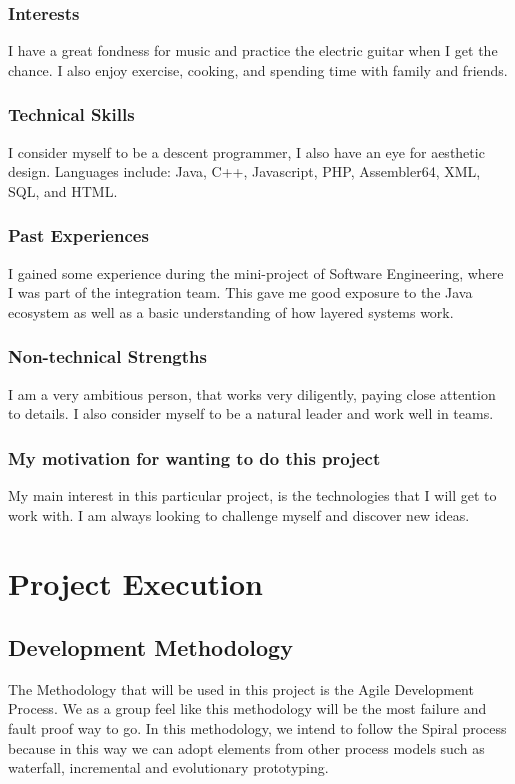 \documentclass[a4paper,12pt]{article}
\begin{document}
			\subsubsection{Interests}
			I have a great fondness for music and practice the electric guitar when I get the chance. I also enjoy exercise, cooking, and spending time with family and friends.
			\subsubsection{Technical Skills}
			I consider myself to be a descent programmer, I also have an eye for aesthetic design. Languages include: Java, C++, Javascript, PHP, Assembler64, XML, SQL, and HTML. 
			\subsubsection{Past Experiences}
			I gained some experience during the mini-project of Software Engineering, where I was part of the integration team. This gave me good exposure to the Java ecosystem as well as a basic understanding of how layered systems work.
			\subsubsection{Non-technical Strengths}
			I am a very ambitious person, that works very diligently, paying close attention to details. I also consider myself to be a natural leader and work well in teams. 
			\subsubsection{My motivation for wanting to do this project}
			My main interest in this particular project, is the technologies that I will get to work with. I am always looking to challenge myself and discover new ideas.
	\newpage
	\section{Project Execution}
	
	\subsection{Development Methodology}  
	
	The Methodology that will be used in this project is the Agile Development Process. We as a group feel like this methodology will be the most failure and fault proof way to go. In this methodology, we intend to follow the Spiral process because in this way we can adopt elements from other process models such as waterfall, incremental and evolutionary prototyping.
\end{document}
